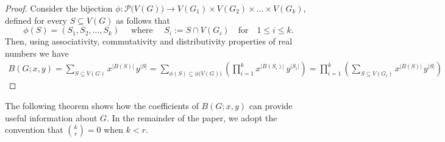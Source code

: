 \documentclass[review]{elsarticle}
\begin{document}
\begin{proof}
Consider the bijection $\phi:\mathcal{P}\big(V(G)\big)\to{V(G_1)\times V(G_2)\times\ldots\times V(G_k)}$, defined for every $S\subseteq V(G)$ as follows that
\[
 \phi(S)=(S_1,S_2,\ldots,S_k) \quad \text{ where } \quad S_i:=S\cap V(G_i) \quad\text{for} \quad 1\le i\le k.
\]
Then, using associativity, commutativity and distributivity properties of real numbers we have
\begin{align*}
    B(G;x,y)=\displaystyle\sum_{S\subseteq V(G)} x^{|B(S)|}\, y^{|S|} = \sum_{\phi(S)\subseteq \phi\big(V(G)\big)} \left( \prod_{i=1}^{k} x^{|B(S_i)|}\, y^{|S_i|} \right)= \prod_{i=1}^{k} \left(\sum_{S\subseteq V(G_i)} x^{|B(S)|}\, y^{|S|} \right)%
\end{align*}
\end{proof}


The following theorem shows how the coefficients of $B(G;x,y)$ can provide useful information about $G$. In the remainder of the paper, we adopt the convention that $\binom{k}{r}=0$ when $k<r$.
\end{document}
